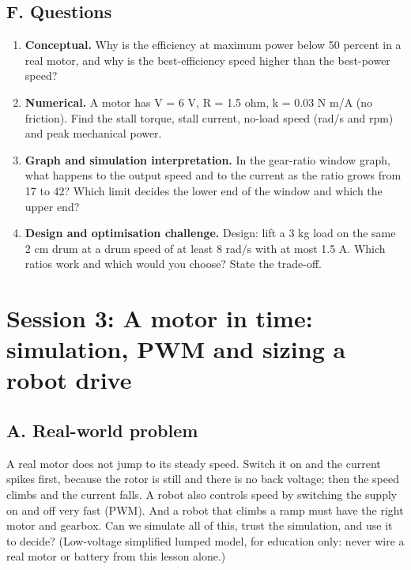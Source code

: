 \documentclass[11pt,a4paper]{article}
\begin{document}
\subsection*{F. Questions}
\begin{enumerate}[nosep]
\item \textbf{Conceptual.} Why is the efficiency at maximum power below 50 percent in a real motor, and why is the best-efficiency speed higher than the best-power speed?
\item \textbf{Numerical.} A motor has V = 6 V, R = 1.5 ohm, k = 0.03 N m/A (no friction). Find the stall torque, stall current, no-load speed (rad/s and rpm) and peak mechanical power.
\item \textbf{Graph and simulation interpretation.} In the gear-ratio window graph, what happens to the output speed and to the current as the ratio grows from 17 to 42? Which limit decides the lower end of the window and which the upper end?
\item \textbf{Design and optimisation challenge.} Design: lift a 3 kg load on the same 2 cm drum at a drum speed of at least 8 rad/s with at most 1.5 A. Which ratios work and which would you choose? State the trade-off.
\end{enumerate}

\section{Session 3: A motor in time: simulation, PWM and sizing a robot drive}

\subsection*{A. Real-world problem}
A real motor does not jump to its steady speed. Switch it on and the current spikes first, because the rotor is still and there is no back voltage; then the speed climbs and the current falls. A robot also controls speed by switching the supply on and off very fast (PWM). And a robot that climbs a ramp must have the right motor and gearbox. Can we simulate all of this, trust the simulation, and use it to decide? (Low-voltage simplified lumped model, for education only: never wire a real motor or battery from this lesson alone.)
\end{document}
